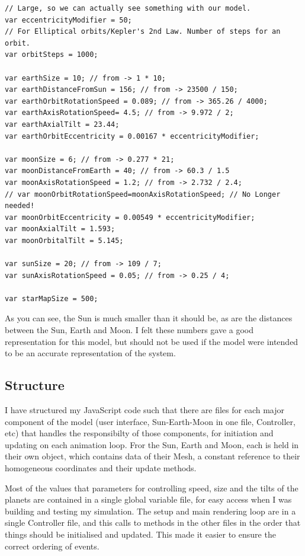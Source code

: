 \documentclass[12pt]{article}
\begin{document}
\begin{lstlisting}
// Large, so we can actually see something with our model.
var eccentricityModifier = 50; 
// For Elliptical orbits/Kepler's 2nd Law. Number of steps for an orbit.
var orbitSteps = 1000;

var earthSize = 10; // from -> 1 * 10; 
var earthDistanceFromSun = 156; // from -> 23500 / 150; 
var earthOrbitRotationSpeed = 0.089; // from -> 365.26 / 4000; 
var earthAxisRotationSpeed= 4.5; // from -> 9.972 / 2; 
var earthAxialTilt = 23.44;
var earthOrbitEccentricity = 0.00167 * eccentricityModifier;

var moonSize = 6; // from -> 0.277 * 21;
var moonDistanceFromEarth = 40; // from -> 60.3 / 1.5
var moonAxisRotationSpeed = 1.2; // from -> 2.732 / 2.4;
// var moonOrbitRotationSpeed=moonAxisRotationSpeed; // No Longer needed!
var moonOrbitEccentricity = 0.00549 * eccentricityModifier;
var moonAxialTilt = 1.593;
var moonOrbitalTilt = 5.145;

var sunSize = 20; // from -> 109 / 7;
var sunAxisRotationSpeed = 0.05; // from -> 0.25 / 4;

var starMapSize = 500;
\end{lstlisting}

As you can see, the Sun is much smaller than it should be, as are the distances between the Sun, Earth and Moon. I felt these numbers gave a good representation for this model, but should not be used if the model were intended to be an accurate representation of the system.

\subsection{Structure}
I have structured my JavaScript code such that there are files for each major component of the model (user interface, Sun-Earth-Moon in one file, Controller, etc) that handles the responsibilty of those components, for initiation and updating on each animation loop. Fror the Sun, Earth and Moon, each is held in their own object, which contains data of their Mesh, a constant reference to their homogeneous coordinates and their update methods.

Most of the values that parameters for controlling speed, size and the tilts of the planets are contained in a single global variable file, for easy access when I was building and testing my simulation. The setup and main rendering loop are in a single Controller file, and this calls to methods in the other files in the order that things should be initialised and updated. This made it easier to ensure the correct ordering of events.
\end{document}

